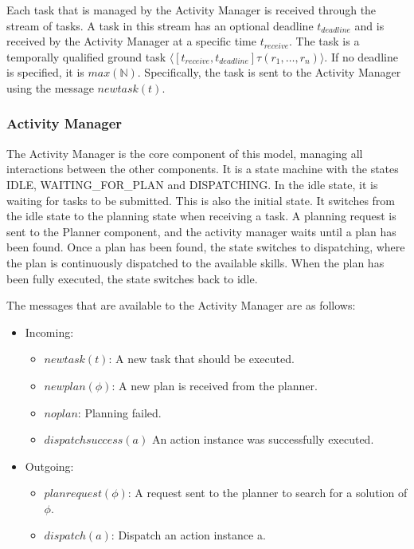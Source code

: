 Each task that is managed by the Activity Manager is received through the stream of tasks.
A task in this stream has an optional deadline $t_{deadline}$ and is received by the Activity Manager at a specific time $t_{receive}$.
The task is a temporally qualified ground task $\langle[t_{receive},t_{deadline}] \tau(r_1,\dots,r_n)\rangle$.
If no deadline is specified, it is $max(\mathbb{N})$.
Specifically, the task is sent to the Activity Manager using the message $newtask(t)$.

\subsubsection{Activity Manager}

The Activity Manager is the core component of this model, managing all interactions between the other components.
It is a state machine with the states IDLE, WAITING\_FOR\_PLAN and DISPATCHING.
In the idle state, it is waiting for tasks to be submitted.
This is also the initial state.
It switches from the idle state to the planning state when receiving a task.
A planning request is sent to the Planner component, and the activity manager waits until a plan has been found.
Once a plan has been found, the state switches to dispatching, where the plan is continuously dispatched to the available skills.
When the plan has been fully executed, the state switches back to idle.

The messages that are available to the Activity Manager are as follows:
\begin{itemize}
    \item Incoming:
    \begin{itemize}
        \item $newtask(t)$: A new task that should be executed. 
        \item $newplan(\phi)$: A new plan is received from the planner.
        \item $noplan$: Planning failed.
        \item $dispatchsuccess(a)$ An action instance was successfully executed.
    \end{itemize}
    \item Outgoing:
    \begin{itemize}
        \item $planrequest(\phi)$: A request sent to the planner to search for a solution of $\phi$.
        \item $dispatch(a)$: Dispatch an action instance a.
    \end{itemize}
\end{itemize}

